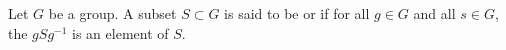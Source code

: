 \begin{definition} \label{definition:conjugacy_invariant_subset_of_a_group}
    Let $G$ be a group. A subset $S \subset G$ is said to be  or  if for all $g \in G$ and all $s \in G$, the  $gSg^{-1}$ is an element of $S$. 
\end{definition}
